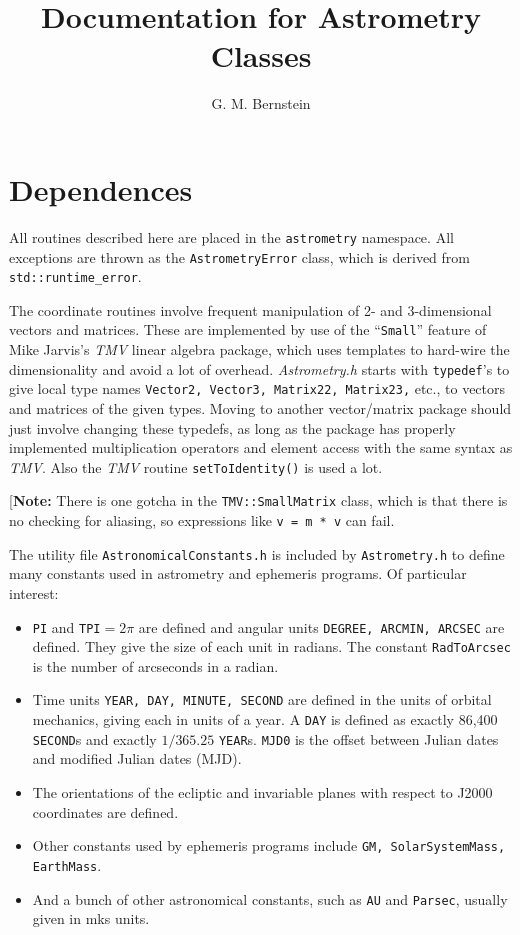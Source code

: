 \documentclass[11pt,preprint,flushrt]{aastex}
\begin{document}

\title{Documentation for Astrometry Classes}

\author{G. M. Bernstein}

\section{Dependences}
All routines described here are placed in the {\tt astrometry} namespace.  All exceptions are thrown as the {\tt AstrometryError} class, which is derived from {\tt std::runtime\_error}.

The coordinate routines involve frequent manipulation of 2- and 3-dimensional vectors and matrices.  These are implemented by use of the ``{\tt Small}'' feature of Mike Jarvis's {\it TMV} linear algebra package, which uses templates to hard-wire the dimensionality and avoid a lot of overhead.  {\it Astrometry.h} starts with {\tt typedef}'s to give local type names {\tt Vector2, Vector3, Matrix22, Matrix23,} etc., to vectors and matrices of the given types.  Moving to another vector/matrix package should just involve changing these typedefs, as long as the package has properly implemented multiplication operators and element access with the same syntax as {\it TMV}.  Also the {\it TMV} routine {\tt setToIdentity()} is used a lot.

[{\bf Note:} There is one gotcha in the {\tt TMV::SmallMatrix} class, which is that there is no checking for aliasing, so expressions like {\tt v = m * v} can fail.

The utility file {\tt AstronomicalConstants.h} is included by {\tt Astrometry.h} to define many constants used in astrometry and ephemeris programs.  Of particular interest:
\begin{itemize}
\item {\tt PI} and {\tt TPI}$=2\pi$ are defined and angular units {\tt DEGREE, ARCMIN, ARCSEC} are defined.  They give the size of each unit in radians.  The constant {\tt RadToArcsec} is the number of arcseconds in a radian.
\item Time units {\tt YEAR, DAY, MINUTE, SECOND} are defined in the units of orbital mechanics, giving each in units of a year.  A {\tt DAY} is defined as exactly 86,400 {\tt SECOND}s and exactly $1/365.25$ {\tt YEAR}s.  {\tt MJD0} is the offset between Julian dates and modified Julian dates (MJD).
\item The orientations of the ecliptic and invariable planes with respect to J2000 coordinates are defined.
\item Other constants used by ephemeris programs include {\tt GM, SolarSystemMass, EarthMass}.
\item And a bunch of other astronomical constants, such as {\tt AU} and {\tt Parsec}, usually given in mks units.
\end{itemize}
\end{document}
